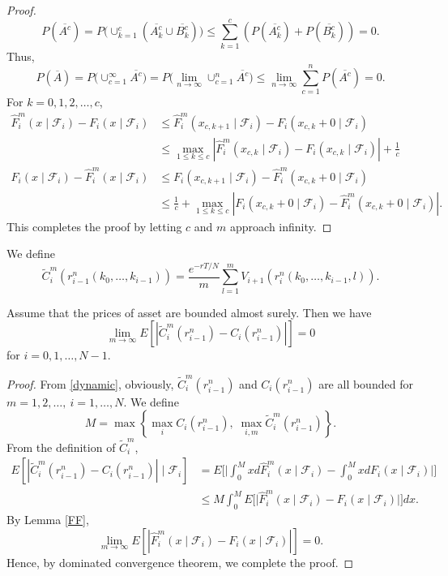 \documentclass[reqno]{amsart}
\begin{document}
\begin{proof}
\[
P\left(\overline{A^c}\right) 
=P\Big(\cup_{k=1}^c\left(\overline{A_k^c} \cup \overline{B_k^c}\right)\Big) 
\leq \sum_{k=1}^c\left(P\left(\overline{A_k^c}\right)+P\left(\overline{B_k^c}\right)
\right)=0.
\]
Thus,
\[
P( \overline{A}) =P\Big(\cup_{c=1}^{\infty} \overline{A^c}\Big)
=P\Big(\lim _{n \to \infty} \cup_{c=1}^n \overline{A^c}\Big) 
\leq \lim _{n \to \infty} \sum_{c=1}^n P\left(\overline{A^c}\right)=0.
\]
For $k=0,1,2, \dots, c$,
\begin{align}
\hat{F}_i^m\left(x\mid \mathcal{F}_i \right)-F_i\left(x\mid \mathcal{F}_i \right) & \leq \hat{F}_i^m\left(x_{c, k+1}\mid \mathcal{F}_i \right)-F_i\left(x_{c, k}+0\mid \mathcal{F}_i\right) \\
& \leq \max_{ 1 \leq k \leq c }\left|\hat{F}_i^m\left(x_{c, k}\mid \mathcal{F}_i \right)-F_i\left(x_{c, k}\mid \mathcal{F}_i\right)\right|+\frac{1}{c}\\
F_i\left(x\mid \mathcal{F}_i \right)-\hat{F}_i^m\left(x\mid \mathcal{F}_i \right) & \leq F_i\left(x_{c, k+1}\mid \mathcal{F}_i\right)-\hat{F}_i^m\left(x_{c, k}+0\mid \mathcal{F}_i \right) \\
& \leq \frac{1}{c}+\max_{ 1 \leq k \leq c }\left|F_i\left(x_{c, k}
+0\mid \mathcal{F}_i\right)-\hat{F}_i^m\left(x_{c, k}+0\mid \mathcal{F}_i \right)\right|.
\end{align}
This completes the proof by letting $c$ and $m$ approach infinity.
\end{proof}

We define
\[
 \widetilde{C}_i^m\left(r_{i-1}^{n}\left(k_0,\dots,k_{i-1}\right)\right)
 =\frac{e^{-rT/N}}{m} \sum_{l=1}^{m} V_{i+1}\left(r_{i}^{n}
 \left(k_0,\dots,k_{i-1},l\right)\right).
\]

\begin{lemma}
\label{CC1}
Assume that the prices of asset are bounded almost surely. Then we have 
 \[
 \lim _{m \to \infty} E\left[\left|\widetilde{C}_i^m\left(r_{i-1}^n\right)-C_i\left(r_{i-1}^n\right)\right|\right] = 0
 \]
for $i=0,1, \dots, N-1$.
\end{lemma}

\begin{proof}
From \eqref{dynamic}, obviously, $\widetilde{C}_i^m\left(r_{i-1}^n\right)$ and 
$C_i\left(r_{i-1}^n\right)$ are all bounded for $m=1,2, \dots, \ i=1, \dots, N$.
We define
\[
 M=\max \left\{\max_i C_i\left(r_{i-1}^n\right), \; 
 \max _{i, m} \widetilde{C}_i^m\left(r_{i-1}^n\right)\right\} .
\]
From the definition of $\widetilde{C}_i^m$,
 \begin{align*}
E\left[\left|\widetilde{C}_i^m\left(r_{i-1}^n\right)-C_i\left(r_{i-1}^n\right)\right| \mid \mathcal{F}_i\right] & =E\Big[\Big|\int_0^M x d \hat{F}_i^m\left(x\mid \mathcal{F}_i \right)-\int_0^M x d F_i\left(x\mid \mathcal{F}_i \right)\Big|\Big] \\
& \leq M\int_0^M E\Big[\Big|\hat{F}_i^m\left(x\mid \mathcal{F}_i \right)
-F_i\left(x\mid \mathcal{F}_i \right)\Big|\Big] d x .
\end{align*}
By Lemma \ref{FF},
\[
 \lim _{m \to \infty} E\left[\left|\hat{F}_i^m\left(x\mid \mathcal{F}_i \right)-F_i\left(x\mid \mathcal{F}_i \right)\right|\right]=0.
\]
Hence, by dominated convergence theorem, we complete the proof.
\end{proof}
\end{document}
